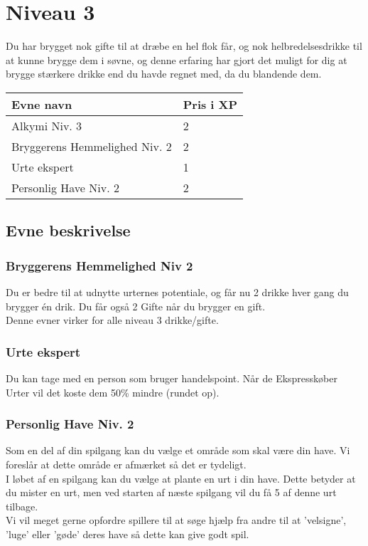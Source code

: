 \chapter{Niveau 3}
Du har brygget nok gifte til at dræbe en hel flok får, og nok helbredelsesdrikke til at kunne brygge dem i søvne, og denne erfaring har gjort det muligt for dig at brygge stærkere drikke end du havde regnet med, da du blandende dem.

\begin{table}[H]
    \centering
    \begin{tabular}{|p{}|p{}|}
    \rowcolor{cerulean!80}\hline
        Evne navn & Pris i XP \\\hline
        Alkymi Niv. 3 & 2\\\hline
        Bryggerens Hemmelighed Niv. 2 & 2\\\hline
        Urte ekspert & 1\\\hline
        Personlig Have Niv. 2 & 2\\
         \hline
    \end{tabular}
\end{table}
\section{Evne beskrivelse}



\subsection{Bryggerens Hemmelighed Niv 2}
Du er bedre til at udnytte urternes potentiale, og får nu 2 drikke hver gang du brygger én drik. Du får også 2 Gifte når du brygger en gift.\\
Denne evner virker for alle niveau 3 drikke/gifte.\\

\subsection{Urte ekspert}
Du kan tage med en person som bruger handelspoint. Når de Ekspresskøber Urter vil det koste dem 50\% mindre (rundet op).

\subsection{Personlig Have Niv. 2}
Som en del af din spilgang kan du vælge et område som skal være din have. Vi foreslår at dette område er afmærket så det er tydeligt.\\
I løbet af en spilgang kan du vælge at plante en urt i din have. Dette betyder at du mister en urt, men ved starten af næste spilgang vil du få 5 af denne urt tilbage.\\
Vi vil meget gerne opfordre spillere til at søge hjælp fra andre til at 'velsigne', 'luge' eller 'gøde' deres have så dette kan give godt spil.\\
